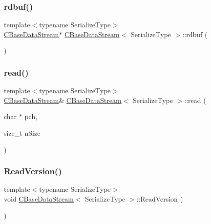 \subsubsection{\texorpdfstring{rdbuf()}{rdbuf()}}
{\footnotesize\ttfamily template$<$typename Serialize\+Type$>$ \\
\mbox{\hyperlink{class_c_base_data_stream}{C\+Base\+Data\+Stream}}$\ast$ \mbox{\hyperlink{class_c_base_data_stream}{C\+Base\+Data\+Stream}}$<$ Serialize\+Type $>$\+::rdbuf (\begin{DoxyParamCaption}{ }\end{DoxyParamCaption})\hspace{0.3cm}{\ttfamily [inline]}}

\mbox{\label{class_c_base_data_stream_a46f9e59af924d509662166af4d232320}} 
\subsubsection{\texorpdfstring{read()}{read()}}
{\footnotesize\ttfamily template$<$typename Serialize\+Type$>$ \\
\mbox{\hyperlink{class_c_base_data_stream}{C\+Base\+Data\+Stream}}\& \mbox{\hyperlink{class_c_base_data_stream}{C\+Base\+Data\+Stream}}$<$ Serialize\+Type $>$\+::read (\begin{DoxyParamCaption}\item[{char $\ast$}]{pch,  }\item[{size\+\_\+t}]{n\+Size }\end{DoxyParamCaption})\hspace{0.3cm}{\ttfamily [inline]}}

\mbox{\label{class_c_base_data_stream_ada664c82a99a1147deeb084df1dab41c}} 
\subsubsection{\texorpdfstring{Read\+Version()}{ReadVersion()}}
{\footnotesize\ttfamily template$<$typename Serialize\+Type$>$ \\
void \mbox{\hyperlink{class_c_base_data_stream}{C\+Base\+Data\+Stream}}$<$ Serialize\+Type $>$\+::Read\+Version (\begin{DoxyParamCaption}{ }\end{DoxyParamCaption})\hspace{0.3cm}{\ttfamily [inline]}}

